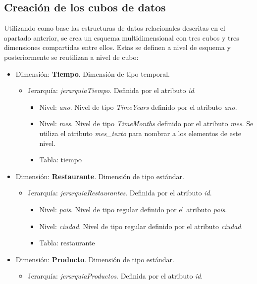 \documentclass[12pt]{opticajnl}
\begin{document}
\newpage 

\subsection{Creación de los cubos de datos}

Utilizando como base las estructuras de datos relacionales descritas en el apartado anterior, se crea un esquema multidimensional con tres cubos y tres dimensiones compartidas entre ellos. Estas se definen a nivel de esquema y posteriormente se reutilizan a nivel de cubo:

\begin{itemize}
\item Dimensión: \textbf{Tiempo}. Dimensión de tipo temporal.
\begin{itemize}
\item Jerarquía: \textit{jerarquiaTiempo}. Definida por el atributo \textit{id}. 
\begin{itemize}
\item Nivel: \textit{ano}. Nivel de tipo \textit{TimeYears} definido por el atributo \textit{ano}.
\item Nivel: \textit{mes}. Nivel de tipo \textit{TimeMonths} definido por el atributo \textit{mes}. Se utiliza el atributo \textit{mes\_texto} para nombrar a los elementos de este nivel.
\item Tabla: tiempo
\end{itemize}
\end{itemize}
\item Dimensión: \textbf{Restaurante}. Dimensión de tipo estándar.
\begin{itemize}
\item Jerarquía: \textit{jerarquiaRestaurantes}. Definida por el atributo \textit{id}.
\begin{itemize}
\item Nivel: \textit{pais}. Nivel de tipo regular definido por el atributo \textit{pais}.
\item Nivel: \textit{ciudad}. Nivel de tipo regular definido por el atributo \textit{ciudad}.
\item Tabla: restaurante
\end{itemize}
\end{itemize}
\item Dimensión: \textbf{Producto}. Dimensión de tipo estándar.
\begin{itemize}
\item Jerarquía: \textit{jerarquiaProductos}. Definida por el atributo \textit{id}.

\end{itemize}
\end{itemize}
\end{document}
